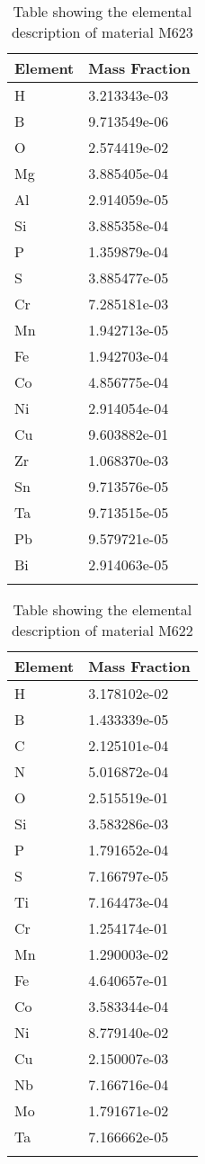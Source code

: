 \begin{centering}
\begin{longtable}[ht!]
{ p{} | p{} }
\hline
Element & Mass Fraction\\
\hline
H &  3.213343e-03\\
B &  9.713549e-06\\
O &  2.574419e-02\\
Mg &  3.885405e-04\\
Al &  2.914059e-05\\
Si &  3.885358e-04\\
P &  1.359879e-04\\
S &  3.885477e-05\\
Cr &  7.285181e-03\\
Mn &  1.942713e-05\\
Fe &  1.942703e-04\\
Co &  4.856775e-04\\
Ni &  2.914054e-04\\
Cu &  9.603882e-01\\
Zr &  1.068370e-03\\
Sn &  9.713576e-05\\
Ta &  9.713515e-05\\
Pb &  9.579721e-05\\
Bi &  2.914063e-05\\
\caption{Table showing the elemental description of material M623}
\label{table:material_M623}
\end{longtable}
\clearpage

\begin{longtable}[ht!]
{ p{} | p{} }
\hline
Element & Mass Fraction\\
\hline
H &  3.178102e-02\\
B &  1.433339e-05\\
C &  2.125101e-04\\
N &  5.016872e-04\\
O &  2.515519e-01\\
Si &  3.583286e-03\\
P &  1.791652e-04\\
S &  7.166797e-05\\
Ti &  7.164473e-04\\
Cr &  1.254174e-01\\
Mn &  1.290003e-02\\
Fe &  4.640657e-01\\
Co &  3.583344e-04\\
Ni &  8.779140e-02\\
Cu &  2.150007e-03\\
Nb &  7.166716e-04\\
Mo &  1.791671e-02\\
Ta &  7.166662e-05\\
\caption{Table showing the elemental description of material M622}
\label{table:material_M622}
\end{longtable}
\clearpage


\end{centering}

